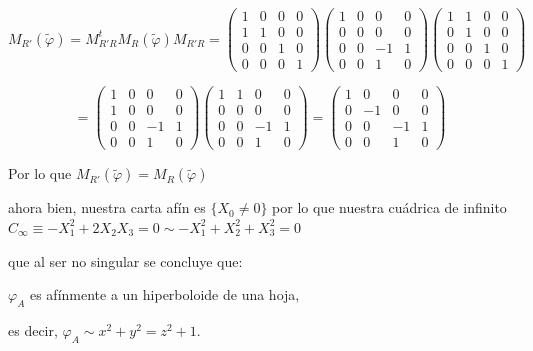 {\[
M_{R'}(\tilde{\varphi}) = M_{R'R}^t M_R(\tilde{\varphi}) M_{R'R} =
\begin{pmatrix}
1 & 0 & 0 & 0 \\
1 & 1 & 0 & 0 \\
0 & 0 & 1 & 0 \\
0 & 0 & 0 & 1
\end{pmatrix}
\begin{pmatrix}
1 & 0 & 0 & 0 \\
0 & 0 & 0 & 0 \\
0 & 0 & -1 & 1 \\
0 & 0 & 1 & 0
\end{pmatrix}
\begin{pmatrix}
1 & 1 & 0 & 0 \\
0 & 1 & 0 & 0 \\
0 & 0 & 1 & 0 \\
0 & 0 & 0 & 1
\end{pmatrix}
\]

\[
=
\begin{pmatrix}
1 & 0 & 0 & 0 \\
1 & 0 & 0 & 0 \\
0 & 0 & -1 & 1 \\
0 & 0 & 1 & 0
\end{pmatrix}
\begin{pmatrix}
1 & 1 & 0 & 0 \\
0 & 0 & 0 & 0 \\
0 & 0 & -1 & 1 \\
0 & 0 & 1 & 0
\end{pmatrix}
=
\begin{pmatrix}
1 & 0 & 0 & 0 \\
0 & -1 & 0 & 0 \\
0 & 0 & -1 & 1 \\
0 & 0 & 1 & 0
\end{pmatrix}
\]

Por lo que $M_{R'}(\tilde{\varphi}) = M_R(\tilde{\varphi})$

ahora bien, nuestra carta afín es $\{X_0 \neq 0\}$ por lo que nuestra cuádrica de infinito $C_\infty \equiv -X_1^2 + 2X_2X_3 = 0 \sim -X_1^2 + X_2^2 + X_3^2 = 0$

que al ser no singular se concluye que:

$\varphi_A$ es afínmente a un hiperboloide de una hoja,

es decir, $\varphi_A \sim x^2 + y^2 = z^2 + 1$.
}


